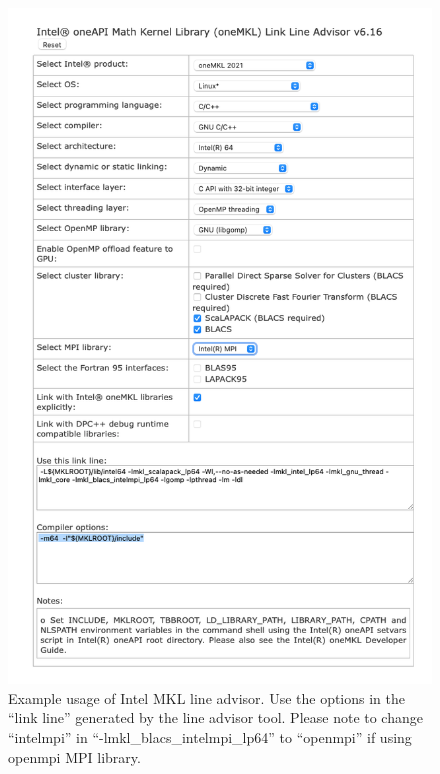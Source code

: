 \begin{figure}[htp]
    \centering
\includegraphics[scale=0.4]{intelmklLineAdvisorExampleNew.png}
    \caption{Example usage of Intel MKL line advisor. Use the options in the ``link line'' generated by the line advisor tool. Please note to change ``intelmpi'' in ``-lmkl\_blacs\_intelmpi\_lp64'' to ``openmpi'' if using openmpi MPI library.}
    \label{fig:intelmkl}
\end{figure}




